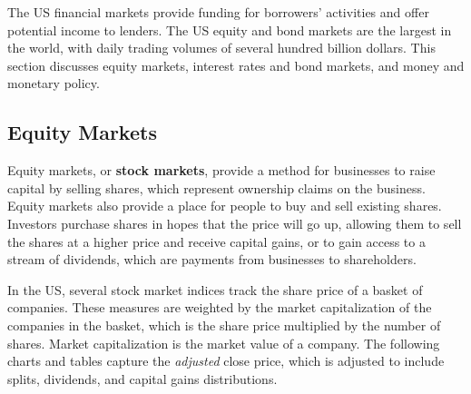 \documentclass{report}
\begin{document}
{\thispagestyle{sectpage}
\begin{minipage}{1.0\textwidth}
\vspace{-1mm}
\small The US financial markets provide funding for borrowers' activities and offer potential income to lenders. The US equity and bond markets are the largest in the world, with daily trading volumes of several hundred billion dollars. This section discusses equity markets, interest rates and bond markets, and money and monetary policy. 
\hypertarget{capeq}{\label{capeq}}
\subsection*{Equity Markets}
    
\small Equity markets, or \textbf{stock markets}, provide a method for businesses to raise capital by selling shares, which represent ownership claims on the business. Equity markets also provide a place for people to buy and sell existing shares. Investors purchase shares in hopes that the price will go up, allowing them to sell the shares at a higher price and receive capital gains, or to gain access to a stream of dividends, which are payments from businesses to shareholders. 

In the US, several stock market indices track the share price of a basket of companies. These measures are weighted by the market capitalization of the companies in the basket, which is the share price multiplied by the number of shares. Market capitalization is the market value of a company. The following charts and tables capture the \textit{adjusted} close price, which is adjusted to include splits, dividends, and capital gains distributions.
\vspace{1mm}


\end{minipage}}
\end{document}
